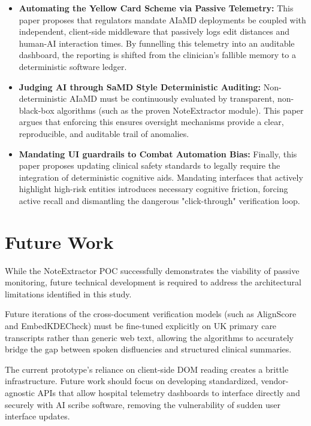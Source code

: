 \documentclass[11pt,a4paper]{article}
\begin{document}
\begin{itemize}
    \item \textbf{Automating the Yellow Card Scheme via Passive Telemetry:} This paper proposes that regulators mandate AIaMD deployments be coupled with independent, client-side middleware that passively logs edit distances and human-AI interaction times. By funnelling this telemetry into an auditable dashboard, the reporting is shifted from the clinician's fallible memory to a deterministic software ledger.

    \item \textbf{Judging AI through SaMD Style Deterministic Auditing:} Non-deterministic AIaMD must be continuously evaluated by transparent, non-black-box algorithms (such as the proven NoteExtractor module). This paper argues that enforcing this ensures oversight mechanisms provide a clear, reproducible, and auditable trail of anomalies.

    \item \textbf{Mandating UI guardrails to Combat Automation Bias:} Finally, this paper proposes updating clinical safety standards to legally require the integration of deterministic cognitive aids. Mandating interfaces that actively highlight high-risk entities introduces necessary cognitive friction, forcing active recall and dismantling the dangerous "click-through" verification loop.
    
\end{itemize}

\section{Future Work}
\label{sec:Future Work}

While the NoteExtractor POC successfully demonstrates the viability of passive monitoring, future technical development is required to address the architectural limitations identified in this study.  

Future iterations of the cross-document verification models (such as AlignScore and EmbedKDECheck) must be fine-tuned explicitly on UK primary care transcripts rather than generic web text, allowing the algorithms to accurately bridge the gap between spoken disfluencies and structured clinical summaries.

The current prototype's reliance on client-side DOM reading creates a brittle infrastructure. Future work should focus on developing standardized, vendor-agnostic APIs that allow hospital telemetry dashboards to interface directly and securely with AI scribe software, removing the vulnerability of sudden user interface updates.
 
\end{document}
